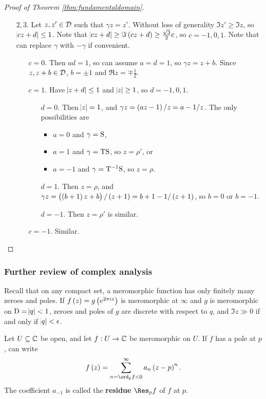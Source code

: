 \begin{proof}[Proof of Theorem \ref{thm:fundamentaldomain}]
\begin{enumerate}
\item[$ 2, 3 $.] Let $ z, z' \in \DDD $ such that $ \gamma z = z' $. Without loss of generality $ \Im z' \ge \Im z $, so $ \abs{cz + d} \le 1 $. Note that $ \abs{cz + d} \ge \Im \br{cz + d} \ge \tfrac{\sqrt{3}}{2}c $, so $ c = -1, 0, 1 $. Note that can replace $ \gamma $ with $ -\gamma $ if convenient.
\begin{itemize}
\item[$ c = 0 $.] Then $ ad = 1 $, so can assume $ a = d = 1 $, so $ \gamma z = z + b $.
Since $ z, z + b \in \DDD $, $ b = \pm 1 $ and $ \Re z = \mp\tfrac{1}{2} $.
\item[$ c = 1 $.] Have $ \abs{z + d} \le 1 $ and $ \abs{z} \ge 1 $, so $ d = -1, 0, 1 $.
\begin{itemize}
\item[$ d = 0 $.] Then $ \abs{z} = 1 $, and $ \gamma z = \br{az - 1} / z = a - 1 / z $.
The only possibilities are
\begin{itemize}
\item $ a = 0 $ and $ \gamma = \S $,
\item $ a = 1 $ and $ \gamma = \T\S $, so $ z = \rho' $, or
\item $ a = -1 $ and $ \gamma = \T^{-1}\S $, so $ z = \rho $.
\end{itemize}
\item[$ d = 1 $.] Then $ z = \rho $, and $ \gamma z = \br{\br{b + 1}z + b} / \br{z + 1} = b + 1 - 1 / \br{z + 1} $, so $ b = 0 $ or $ b = -1 $.
\item[$ d = -1 $.] Then $ z = \rho' $ is similar.
\end{itemize}
\item[$ c = -1 $.] Similar.
\end{itemize}
\end{enumerate}
\end{proof}

\subsubsection{Further review of complex analysis}

Recall that on any compact set, a meromorphic function has only finitely many zeroes and poles. If $ f\br{z} = g\br{e^{2\pi i z}} $ is meromorphic at $ \infty $ and $ g $ is meromorphic on $ \D = \abs{q} < 1 $, zeroes and poles of $ g $ are discrete with respect to $ q $, and $ \Im z \gg 0 $ if and only if $ \abs{q} < \epsilon $.

\begin{definition}
Let $ U \subseteq \CC $ be open, and let $ f : U \to \CC $ be meromorphic on $ U $. If $ f $ has a pole at $ p $, can write
$$ f\br{z} = \sum_{n = \ord_p f < 0}^\infty a_n\br{z - p}^n. $$
The coefficient $ a_{-1} $ is called the \textbf{residue} $ \Res_p f $ of $ f $ at $ p $.
\end{definition}

